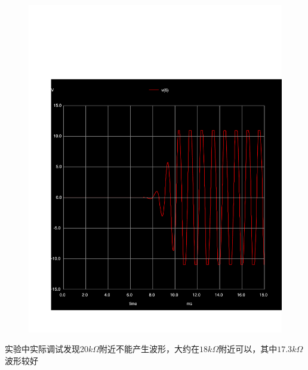 ﻿\documentclass[10.5pt]{ctexart}
\begin{document}
\begin{figure}[!ht]
\centering
\includegraphics[width=400pt]{tranWave.pdf}
\end{figure}
实验中实际调试发现20$k\Omega$附近不能产生波形，大约在$18k\Omega$附近可以，其中$17.3k\Omega$波形较好
\end{document}
